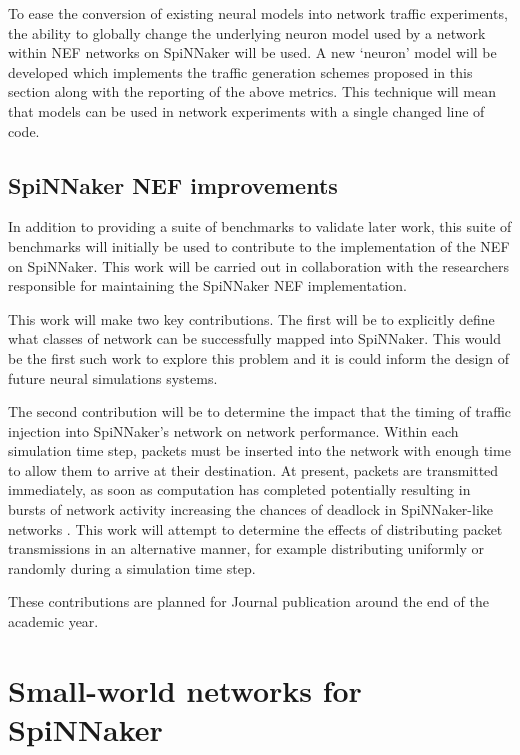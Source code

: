 			To ease the conversion of existing neural models into network traffic
			experiments, the ability to globally change the underlying neuron model
			used by a network within NEF networks on SpiNNaker will be used. A new
			`neuron' model will be developed which implements the traffic generation
			schemes proposed in this section along with the reporting of the above
			metrics. This technique will mean that models can be used in network
			experiments with a single changed line of code.
		
		\subsection{SpiNNaker NEF improvements}
			
			In addition to providing a suite of benchmarks to validate later work,
			this suite of benchmarks will initially be used to contribute to the
			implementation of the NEF on SpiNNaker. This work will be carried out in
			collaboration with the researchers responsible for maintaining the
			SpiNNaker NEF implementation.
			
			This work will make two key contributions. The first will be to explicitly
			define what classes of network can be successfully mapped into SpiNNaker.
			This would be the first such work to explore this problem and it is could
			inform the design of future neural simulations systems.
			
			The second contribution will be to determine the impact that the timing of
			traffic injection into SpiNNaker's network on network performance. Within
			each simulation time step, packets must be inserted into the network with
			enough time to allow them to arrive at their destination. At present,
			packets are transmitted immediately, as soon as computation has completed
			potentially resulting in bursts of network activity increasing the chances
			of deadlock in SpiNNaker-like networks \cite{dally04}. This work will
			attempt to determine the effects of distributing packet transmissions in
			an alternative manner, for example distributing uniformly or randomly
			during a simulation time step.
			
			These contributions are planned for Journal publication around the end of
			the academic year.
	
	\section{Small-world networks for SpiNNaker}
		
